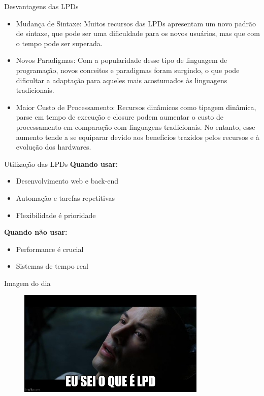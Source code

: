 \documentclass{beamer}
\begin{document}
\begin{frame}{Desvantagens das LPDs}\justifying

	\begin{itemize}
		\item Mudança de Sintaxe: Muitos recursos das LPDs apresentam um novo padrão de sintaxe, que pode ser uma dificuldade para os novos usuários, mas que com o tempo pode ser superada.
		\item Novos Paradigmas: Com a popularidade desse tipo de linguagem de programação, novos conceitos e paradigmas foram surgindo, o que pode dificultar a adaptação para aqueles mais acostumados às linguagens tradicionais.
		\item Maior Custo de Processamento: Recursos dinâmicos como tipagem dinâmica, parse em tempo de execução e closure podem aumentar o custo de processamento em comparação com linguagens tradicionais. No entanto, esse aumento tende a se equiparar devido aos benefícios trazidos pelos recursos e à evolução dos hardwares.
	\end{itemize}
\end{frame}



\begin{frame}{Utilização das LPDs}
	\textbf{Quando usar:}
	\begin{itemize}
		\item Desenvolvimento web e back-end
		\item Automação e tarefas repetitivas
		\item Flexibilidade é prioridade
	\end{itemize}
	\textbf{Quando não usar:}
	\begin{itemize}
		\item Performance é crucial
		\item Sistemas de tempo real
	\end{itemize}
\end{frame}

\footlinecolor{}
\begin{frame}[fragile]{Imagem do dia}

	\begin{figure}[H]
		\centerline{\includegraphics[width=0.8\textwidth]{assets/imagem-do-dia/neo-lpd.jpg}}

	\end{figure}
\end{frame}
\backmatter
\end{document}
